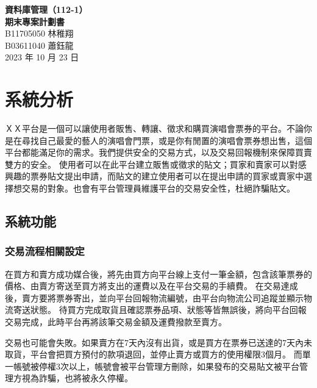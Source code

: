 \documentclass[12pt,a4paper]{article}
\begin{document}
\title{}
\author{}
\date{}

\begin{center}
\textbf{\Large 資料庫管理（112-1） \\[5pt]
期末專案計劃書} \\[10pt]
B11705050 林稚翔 \\
B03611040 蕭鈺龍 \\ 
2023 年 10 月 23 日
\end{center}





\section{系統分析}

ＸＸ平台是一個可以讓使用者販售、轉讓、徵求和購買演唱會票券的平台。不論你是在尋找自己最愛的藝人的演唱會門票，或是你有閒置的演唱會票券想出售，這個平台都能滿足你的需求。我們提供安全的交易方式，以及交易回報機制來保障買賣雙方的安全。
使用者可以在此平台建立販售或徵求的貼文；買家和賣家可以對感興趣的票券貼文提出申請，而貼文的建立使用者可以在提出申請的買家或賣家中選擇想交易的對象。也會有平台管理員維護平台的交易安全性，杜絕詐騙貼文。

\subsection{系統功能}    

\subsubsection{交易流程相關設定}

在買方和賣方成功媒合後，將先由買方向平台線上支付一筆金額，包含該筆票券的價格、由賣方寄送至買方將支出的運費以及在平台交易的手續費。
在交易達成後，賣方要將票券寄出，並向平台回報物流編號，由平台向物流公司追蹤並顯示物流寄送狀態。
待買方完成取貨且確認票券品項、狀態等皆無誤後，將向平台回報交易完成，此時平台再將該筆交易金額及運費撥款至賣方。

交易也可能會失敗。如果賣方在7天內沒有出貨，或是買方在票券已送達的7天內未取貨，平台會把買方預付的款項退回，並停止賣方或買方的使用權限3個月。
而單一帳號被停權3次以上，帳號會被平台管理方刪除，如果發布的交易貼文被平台管理方視為詐騙，也將被永久停權。
\end{document}
